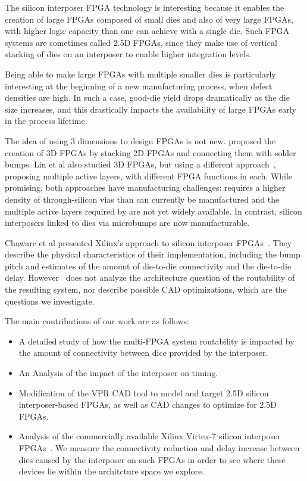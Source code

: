 \documentclass[journal]{IEEEtran}
\begin{document}
The silicon interposer FPGA technology is interesting because it enables the creation of large FPGAs composed of small dies and also of very large FPGAs, with higher logic capacity than one can achieve with a single die. Such FPGA systems are sometimes called 2.5D FPGAs, since they make use of vertical stacking of dies on an interposer to enable higher integration levels.

Being able to make large FPGAs with multiple smaller dies is particularly interesting at the beginning of a new manufacturing process, when defect densities are high. In such a case, good-die yield drops dramatically as the die size increases, and this drastically impacts the availability of large FPGAs early in the process lifetime.

The idea of using 3 dimensions to design FPGAs is not new. \cite{3dfpga1995} proposed the creation of 3D FPGAs by stacking 2D FPGAs and connecting them with solder bumps. Lin et al also studied 3D FPGAs, but using a different approach~\cite{3dfpga}, proposing multiple active layers, with different FPGA functions in each. While promising, both approaches have manufacturing challenges: \cite{3dfpga1995} requires a higher density of through-silicon vias than can currently be manufactured and the multiple active layers required by \cite{3dfpga} are not yet widely available. In contrast, silicon interposers linked to dies via microbumps are now manufacturable.

Chaware et al presented Xilinx's approach to silicon interposer FPGAs~\cite{xilinxTSV}. They describe the physical characteristics of their implementation, including the bump pitch and estimates of the amount of die-to-die connectivity and the die-to-die delay. However~\cite{xilinxTSV} does not analyze the architecture question of the routability of the resulting system, nor describe possible CAD optimizations, which are the questions we investigate.

The main contributions of our work are as follows:
\begin{itemize}
	\item A detailed study of how the multi-FPGA system routability is impacted by the amount of connectivity between dice provided by the interposer.
	\item An Analysis of the impact of the interposer on timing.
	\item Modification of the VPR CAD tool to model and target 2.5D silicon interposer-based FPGAs, as well as CAD changes to optimize for 2.5D FPGAs.
	\item Analysis of the commercially available Xilinx Virtex-7 silicon interposer FPGAs~\cite{xilinxWP}\cite{xilinx7series}. We measure the connectivity reduction and delay increase between dies caused by the interposer on such FPGAs in order to see where these devices lie within the architcture space we explore.
\end{itemize}
\end{document}
